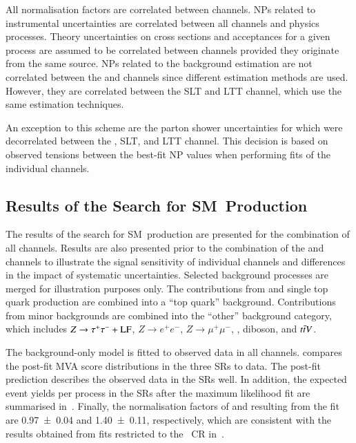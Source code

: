 All normalisation factors are correlated between channels. NPs related to
instrumental uncertainties are correlated between all channels and physics
processes. Theory uncertainties on cross sections and acceptances for a given
process are assumed to be correlated between channels provided they originate
from the same source. NPs related to the \faketauhadvis background estimation
are not correlated between the \hadhad and \lephad channels since different
estimation methods are used. However, they are correlated between the \lephad
SLT and LTT channel, which use the same estimation techniques.

An exception to this scheme are the parton shower uncertainties for \ttbar which
were decorrelated between the \hadhad, \lephad SLT, and \lephad LTT
channel. This decision is based on observed tensions between the best-fit NP
values when performing fits of the individual channels.



\subsection{Results of the Search for SM~\HH Production}%
\label{sec:results_nonres}

The results of the search for SM~\HH production are presented for the
combination of all channels. Results are also presented prior to the combination
of the \hadhad and \lephad channels to illustrate the signal sensitivity of
individual channels and differences in the impact of systematic uncertainties.
Selected background processes are merged for illustration purposes only. The
contributions from \ttbar and single top quark production are combined into a
``top quark'' background. Contributions from minor backgrounds are combined into
the ``other'' background category, which includes $Z \to \tau^{+} \tau^{-} + \text{LF}$,
$Z \to e^{+}e^{-}$, $Z \to \mu^{+}\mu^{-}$, \Wjets, diboson, and $t\bar{t} V$.

The background-only model is fitted to observed data in all
channels.  compares the post-fit MVA score
distributions in the three SRs to data. The post-fit prediction describes the
observed data in the SRs well. In addition, the expected event yields per
process in the SRs after the maximum likelihood fit are summarised
in~. Finally, the normalisation factors of \ttbar
and \ZHF resulting from the fit are \num{0.97 +- 0.04} and \num{1.40 +- 0.11},
respectively, which are consistent with the results obtained from fits
restricted to the \ZHF~CR in~.

